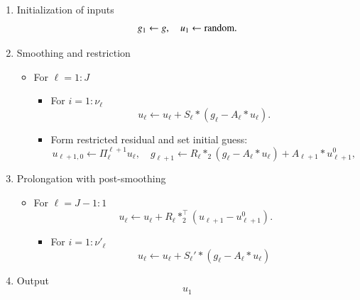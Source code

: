 \begin{breakablealgorithm}\label{alg:multigrid-Pi}
\begin{enumerate}
\item Initialization of inputs
		$$
		g_1 \leftarrow g, \quad
                u_{1}\leftarrow {\rm random}.
		$$
	\vspace{-.6mm}
\item Smoothing and restriction
  \begin{itemize}
  \item  For $\ell = 1:J$
    \begin{itemize}%
    \item For $i = 1:\nu_\ell$
		\begin{equation}\label{eq:smoothing}
		u_{\ell} \leftarrow u_{\ell} + S_\ell \ast (g_\ell - A_\ell \ast u_{\ell}).
		\end{equation}
\item  Form restricted residual and set initial guess:
\begin{equation*}
u_{\ell+1,0} \leftarrow\Pi_\ell^{\ell+1}u_{\ell},  \quad g_{\ell+1} \leftarrow R_\ell \ast_2 (g_\ell -  A_\ell \ast u_{\ell}) + A_{\ell+1} \ast u_{\ell+1}^0,
\end{equation*}
    \end{itemize} %
  \end{itemize}
\item  Prolongation with post-smoothing
  \begin{itemize} %
  \item For {$\ell = J-1:1$}
		$$
		u_{\ell} \leftarrow u_{\ell} + R_\ell  \ast_2^{\top} (u_{\ell+1}-u_{\ell+1}^0).
		$$
		
                \begin{itemize}
  \item For $i = 1:\nu'_\ell$
		$$
		u_{\ell} \leftarrow u_{\ell} + S_\ell' \ast (g_\ell - A_\ell \ast u_{\ell})
		$$
                \end{itemize}
                \end{itemize} %
\item Output
		$$
u_1
		$$
\end{enumerate} %
\end{breakablealgorithm}

